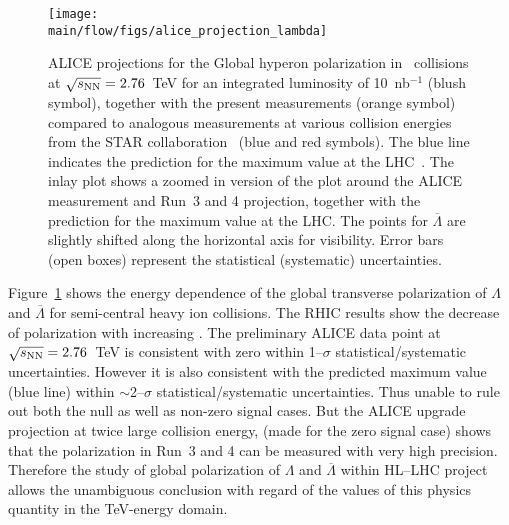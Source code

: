 \begin{figure*}[!htb]
\begin{center}
\texttt{[image: \\main/flow/figs/alice\_projection\_lambda]}
\caption{
ALICE projections for the Global hyperon polarization in \pbpb\ 
  collisions at $\sqrt{s_{\mathrm{NN}}}=2.76$~TeV for an integrated luminosity of 
  10~nb$^{-1}$ (blush symbol), together with the present measurements (orange symbol) 
  compared to analogous measurements at various collision energies from the STAR 
  collaboration~\cite{STAR:2017ckg, Abelev:2007zk} (blue and red symbols). 
The blue line indicates the prediction for the maximum value at the 
  LHC~\cite{Voloshin:ICPPA2}. 
The inlay plot shows a zoomed in version of the plot around the ALICE 
  measurement and Run~3 and 4 projection, together with the prediction 
  for the maximum value at the LHC.
The points for $\overline{\Lambda}$ are slightly shifted along the horizontal 
  axis for visibility.  
Error bars (open boxes) represent the statistical (systematic) uncertainties.}
\label{fig:alice_lambda}
\end{center}
\end{figure*}

Figure~\ref{fig:alice_lambda} shows the energy dependence of the global 
  transverse polarization of $\Lambda$ and $\overline{\Lambda}$ for
  semi-central heavy ion collisions. 
The RHIC results show the decrease of polarization with increasing \snn. 
The preliminary ALICE data point at $\sqrt{s_{\mathrm{NN}}}=2.76$~TeV is consistent with zero
  within 1--$\sigma$ statistical/systematic uncertainties.
However it is also consistent with the predicted maximum value (blue line)
  within $\sim$2--$\sigma$ statistical/systematic uncertainties.
Thus unable to rule out both the null as well as non-zero signal cases.
But the ALICE upgrade projection at twice large collision energy,
  (made for the zero signal case) shows that the polarization in Run~3 
  and 4 can be measured with very high precision. 
Therefore the study of global polarization of $\Lambda$ and $\overline{\Lambda}$ 
  within HL--LHC project allows the unambiguous conclusion with regard of the 
  values of this physics quantity in the TeV-energy domain. 


